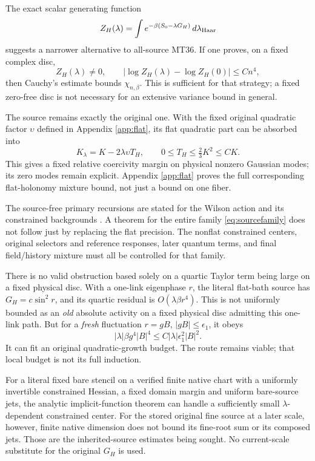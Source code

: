 \documentclass[11pt,letterpaper]{article}
\theoremstyle{remark}\newtheorem{remark}[theorem]{Remark}
\begin{document}
The exact scalar generating function
\begin{equation}\label{eq:sourcefamily}
 Z_H(\lambda)=\int e^{-\beta(S_0-\lambda G_H)}\,d\lambda_{\rm Haar}
\end{equation}
suggests a narrower alternative to all-source MT36. If one proves, on a fixed complex disc,
\[
 Z_H(\lambda)\ne0,\qquad
 |\log Z_H(\lambda)-\log Z_H(0)|\le Cn^4,
\]
then Cauchy's estimate bounds \(\chi_{n,\beta}\). This is sufficient for that strategy; a fixed zero-free disc is not necessary for an extensive variance bound in general.

The source remains exactly the original one. With the fixed original quadratic factor \(\upsilon\) defined in Appendix \ref{app:flat}, its flat quadratic part can be absorbed into
\[
 K_\lambda=K-2\lambda\upsilon T_H,\qquad
 0\le T_H\le\tfrac23K^2\le CK.
\]
This gives a fixed relative coercivity margin on physical nonzero Gaussian modes; its zero modes remain explicit. Appendix \ref{app:flat} proves the full corresponding flat-holonomy mixture bound, not just a bound on one fiber.

The source-free primary recursions are stated for the Wilson action and its constrained backgrounds \cite{RGI,RGII}. A theorem for the entire family \eqref{eq:sourcefamily} does not follow just by replacing the flat precision. The nonflat constrained centers, original selectors and reference responses, later quantum terms, and final field/history mixture must all be controlled for that family.

There is no valid obstruction based solely on a quartic Taylor term being large on a fixed physical disc. With a one-link eigenphase \(r\), the literal flat-bath source has \(G_H=c\sin^2r\), and its quartic residual is \(O(\lambda\beta r^4)\). This is not uniformly bounded as an \emph{old} absolute activity on a fixed physical disc admitting this one-link path. But for a \emph{fresh} fluctuation \(r=gB\), \(|gB|\le\epsilon_1\), it obeys
\[
 |\lambda|\beta g^4|B|^4
 \le C|\lambda|\epsilon_1^2|B|^2.
\]
It can fit an original quadratic-growth budget. The route remains viable; that local budget is not its full induction.

For a literal fixed bare stencil on a verified finite native chart with a uniformly invertible constrained Hessian, a fixed domain margin and uniform bare-source jets, the analytic implicit-function theorem can handle a sufficiently small \(\lambda\)-dependent constrained center. For the stored original fine source at a later scale, however, finite native dimension does not bound its fine-root sum or its composed jets. Those are the inherited-source estimates being sought. No current-scale substitute for the original \(G_H\) is used.
\end{document}
